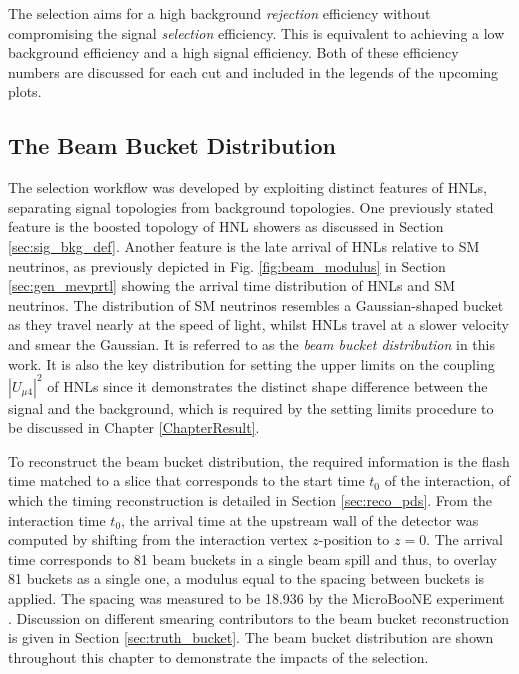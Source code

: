The selection aims for a high background \textit{rejection} efficiency without compromising the signal \textit{selection} efficiency.                                                                             
This is equivalent to achieving a low background efficiency and a high signal efficiency.
Both of these efficiency numbers are discussed for each cut and included in the legends of the upcoming plots.                                                                                             


\subsection{The Beam Bucket Distribution}
\label{sec:key_dist}

The selection workflow was developed by exploiting distinct features of HNLs, separating signal topologies from background topologies.
One previously stated feature is the boosted topology of HNL showers as discussed in Section \ref{sec:sig_bkg_def}.
Another feature is the late arrival of HNLs relative to SM neutrinos, as previously depicted in Fig. \ref{fig:beam_modulus} in Section \ref{sec:gen_mevprtl} showing the arrival time distribution of HNLs and SM neutrinos.
The distribution of SM neutrinos resembles a Gaussian-shaped bucket as they travel nearly at the speed of light, whilst HNLs travel at a slower velocity and smear the Gaussian.
It is referred to as the \textit{beam bucket distribution} in this work.
It is also the key distribution for setting the upper limits on the coupling $|U_{\mu4}|^2$ of HNLs since it demonstrates the distinct shape difference between the signal and the background, which is required by the setting limits procedure to be discussed in Chapter \ref{ChapterResult}.

To reconstruct the beam bucket distribution, the required information is the flash time matched to a slice that corresponds to the start time $t_0$ of the interaction, of which the timing reconstruction is detailed in Section \ref{sec:reco_pds}.
From the interaction time $t_0$, the arrival time at the upstream wall of the detector was computed by shifting from the interaction vertex $z$-position to $z = 0$.
The arrival time corresponds to 81 beam buckets in a single beam spill and thus, to overlay 81 buckets as a single one, a modulus equal to the spacing between buckets is applied.
The spacing was measured to be 18.936 by the MicroBooNE experiment \cite{uboone_ns}.
Discussion on different smearing contributors to the beam bucket reconstruction is given in Section \ref{sec:truth_bucket}.
The beam bucket distribution are shown throughout this chapter to demonstrate the impacts of the selection.

